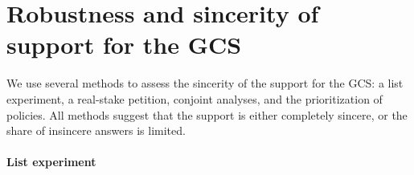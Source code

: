 \documentclass{nature}
\makeatletter
\renewenvironment*{figure}{\@float{figure}}{\end@float}
\makeatother
\begin{document}



\section{Robustness and sincerity of support for the GCS}\label{subsec:robustness_sincerity}

We use several methods to assess the sincerity of the support for the GCS: a list experiment, a real-stake petition, conjoint analyses, and the prioritization of policies. All methods suggest that the support is either completely sincere, or the share of insincere answers is limited. %

\paragraph{List experiment}\label{subsubsec:list_exp} %
\end{document}

